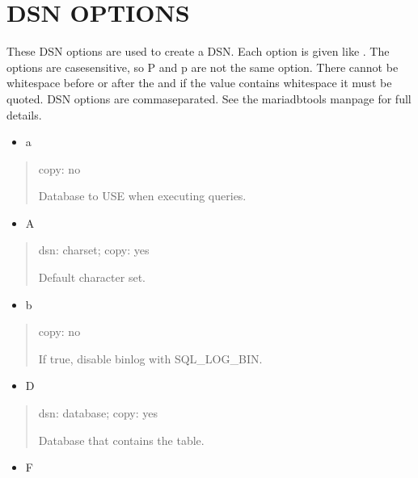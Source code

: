 \documentclass[letterpaper,10pt,english]{sphinxmanual}
\begin{document}
\section{DSN OPTIONS}
\label{\detokenize{mariadb-archiver:dsn-options}}
These DSN options are used to create a DSN.  Each option is given like
.  The options are case\sphinxhyphen{}sensitive, so P and p are not the
same option.  There cannot be whitespace before or after the \sphinxcode{\sphinxupquote{=}} and
if the value contains whitespace it must be quoted.  DSN options are
comma\sphinxhyphen{}separated.  See the mariadb\sphinxhyphen{}tools manpage for full details.
\begin{itemize}
\item {} 
a

\end{itemize}
\begin{quote}

copy: no

Database to USE when executing queries.
\end{quote}
\begin{itemize}
\item {} 
A

\end{itemize}
\begin{quote}

dsn: charset; copy: yes

Default character set.
\end{quote}
\begin{itemize}
\item {} 
b

\end{itemize}
\begin{quote}

copy: no

If true, disable binlog with SQL\_LOG\_BIN.
\end{quote}
\begin{itemize}
\item {} 
D

\end{itemize}
\begin{quote}

dsn: database; copy: yes

Database that contains the table.
\end{quote}
\begin{itemize}
\item {} 
F

\end{itemize}
\end{document}
